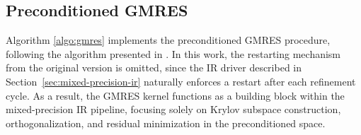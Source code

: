 \subsection{Preconditioned GMRES}
\label{sec:preconditioned-gmres}

Algorithm \ref{algo:gmres} implements the preconditioned GMRES procedure, following
the algorithm presented in \cite{lindquist_improving_2020}. In this work, the
restarting mechanism from the original version is omitted, since the IR driver
described in Section~\ref{sec:mixed-precision-ir} naturally enforces a restart
after each refinement cycle. As a result, the GMRES kernel functions as a
building block within the mixed-precision IR pipeline, focusing solely on Krylov
subspace construction, orthogonalization, and residual minimization in the
preconditioned space.

